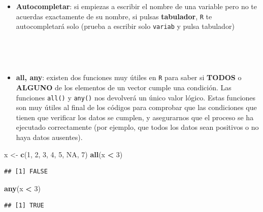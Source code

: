 \documentclass[11pt,]{book}
\newenvironment{Shaded}{\begin{snugshade}}{\end{snugshade}}
\newcommand{\DecValTok}[1]{\textcolor[rgb]{0.06,0.06,0.06}{#1}}
\newcommand{\KeywordTok}[1]{\textcolor[rgb]{0.27,0.27,0.27}{\textbf{#1}}}
\newcommand{\NormalTok}[1]{#1}
\newcommand{\OperatorTok}[1]{\textcolor[rgb]{0.43,0.43,0.43}{\textbf{#1}}}
\newcommand{\OtherTok}[1]{\textcolor[rgb]{0.37,0.37,0.37}{#1}}
\newcommand{\StringTok}[1]{\textcolor[rgb]{0.5,0.5,0.5}{#1}}
\providecommand{\tightlist}{%
  \setlength{\itemsep}{0pt}\setlength{\parskip}{0pt}}
\begin{document}
~

~

\begin{itemize}
\tightlist
\item
  \textbf{Autocompletar}: si empiezas a escribir el nombre de una variable pero no te acuerdas exactamente de su nombre, si pulsas \textbf{tabulador}, \texttt{R} te autocompletará solo (prueba a escribir solo \texttt{variab} y pulsa tabulador)
\end{itemize}

~

~

\begin{itemize}
\tightlist
\item
  \textbf{all, any}: existen dos funciones muy útiles en \texttt{R} para saber si \textbf{TODOS} o \textbf{ALGUNO} de los elementos de un vector cumple una condición. Las funciones \texttt{all()} y \texttt{any()} nos devolverá un único valor lógico. Estas funciones son muy útiles al final de los códigos para comprobar que las condiciones que tienen que verificar los datos se cumplen, y asegurarnos que el proceso se ha ejecutado correctamente (por ejemplo, que todos los datos sean positivos o no haya datos ausentes).
\end{itemize}

\begin{Shaded}
\begin{Highlighting}[]
\NormalTok{x <-}\StringTok{ }\KeywordTok{c}\NormalTok{(}\DecValTok{1}\NormalTok{, }\DecValTok{2}\NormalTok{, }\DecValTok{3}\NormalTok{, }\DecValTok{4}\NormalTok{, }\DecValTok{5}\NormalTok{, }\OtherTok{NA}\NormalTok{, }\DecValTok{7}\NormalTok{)}
\KeywordTok{all}\NormalTok{(x }\OperatorTok{<}\StringTok{ }\DecValTok{3}\NormalTok{)}
\end{Highlighting}
\end{Shaded}

\begin{verbatim}
## [1] FALSE
\end{verbatim}

\begin{Shaded}
\begin{Highlighting}[]
\KeywordTok{any}\NormalTok{(x }\OperatorTok{<}\StringTok{ }\DecValTok{3}\NormalTok{)}
\end{Highlighting}
\end{Shaded}

\begin{verbatim}
## [1] TRUE
\end{verbatim}
\end{document}
